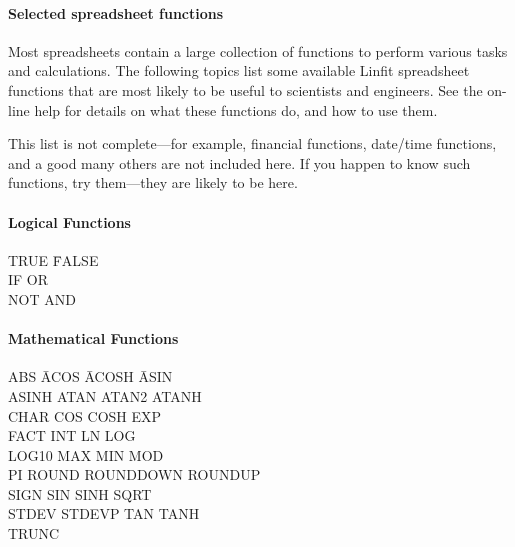 \paragraph*{Selected spreadsheet functions}
Most spreadsheets contain a large collection of functions to perform
various tasks and calculations.  The following topics list some
available Linfit spreadsheet functions that are most likely to be
useful to scientists and engineers.  See the on-line help for details
on what these functions do, and how to use them.

This list is not complete---for
example, financial functions, date/time functions, and a good many
others are not included here.  If you happen to know such functions,
try them---they are likely to be here.

\paragraph*{Logical Functions}
\begin{center}
\begin{tabbing}	
TRUE \hspace{1in} \= FALSE \\
IF               \> OR   \\
NOT              \>       AND
\end{tabbing}
\end{center}
%
\paragraph*{Mathematical Functions}
\begin{tabbing}
ABS \hspace*{1in} \=  ACOS \hspace*{1in}  \= ACOSH \hspace*{1in} \=  ASIN \\
ASINH    \>  ATAN  \>  ATAN2  \>  ATANH \\
CHAR     \>  COS   \>  COSH   \>  EXP   \\
FACT     \>  INT   \>  LN     \>  LOG  \\
LOG10    \>  MAX   \>  MIN    \>  MOD  \\
PI       \>  ROUND \>  ROUNDDOWN   \>  ROUNDUP \\
SIGN     \>  SIN   \>  SINH   \>  SQRT   \\
STDEV    \>  STDEVP \> TAN    \>  TANH  \\
TRUNC   \\
\end{tabbing}

